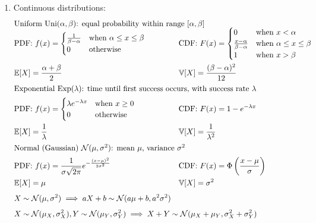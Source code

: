 \documentclass{article}
\begin{document}
\begin{enumerate}
	\item Continuous distributions:
		\vspace*{-\baselineskip}
		\begin{align*}
			\intertext{Uniform $\mathrm{Uni}(\alpha,\beta)$: equal probability within range $[\alpha,\beta]$\vspace*{-0.5\baselineskip}}
			&\text{PDF: }f(x)=\begin{cases}
				\frac{1}{\beta-\alpha} &\text{when $\alpha\leq x\leq\beta$} \\
				0 &\text{otherwise}
			\end{cases} &&\hspace*{-3.9cm}\text{CDF: }F(x)=\begin{cases}
				0 &\text{when $x<\alpha$} \\
				\frac{x-\alpha}{\beta-\alpha} &\text{when $\alpha\leq x\leq\beta$} \\
				1 &\text{when $x>\beta$}
			\end{cases} \\
			&\mathbb{E}[X]=\frac{\alpha+\beta}{2} &&\hspace*{-3.9cm}\mathbb{V}[X]=\frac{(\beta-\alpha)^2}{12} \\
			\intertext{Exponential $\mathrm{Exp}(\lambda)$: time until first success occurs, with success rate $\lambda$}
			&\text{PDF: }f(x)=\begin{cases}
				\lambda e^{-\lambda x} &\text{when $x\geq0$} \\
				0 &\text{otherwise}
			\end{cases} &&\hspace*{-3.9cm}\text{CDF: }F(x)=1-e^{-\lambda x} \\
			&\mathbb{E}[X]=\frac{1}{\lambda} &&\hspace*{-3.9cm}\mathbb{V}[X]=\frac{1}{\lambda^2} \\
			\intertext{Normal (Gaussian) $\mathcal{N}(\mu,\sigma^2)$: mean $\mu$, variance $\sigma^2$}
			&\text{PDF: }f(x)=\frac{1}{\sigma\sqrt{2\pi}}e^{-\frac{(x-\mu)^2}{2\sigma^2}}&&\hspace*{-3.9cm}\text{CDF: }F(x)=\Phi\left(\frac{x-\mu}{\sigma}\right) \\
			&\mathbb{E}[X]=\mu &&\hspace*{-3.9cm}\mathbb{V}[X]=\sigma^2 \\[0.25\baselineskip]
			&X\sim\mathcal{N}(\mu,\sigma^2)\implies aX+b\sim\mathcal{N}(a\mu+b,a^2\sigma^2) \\[0.25\baselineskip]
			&X\sim\mathcal{N}(\mu_X,\sigma_X^2),Y\sim\mathcal{N}(\mu_Y,\sigma_Y^2)\implies X+Y\sim\mathcal{N}(\mu_X+\mu_Y,\sigma_X^2+\sigma_Y^2)
		\end{align*}
	

\end{enumerate}
\end{document}
